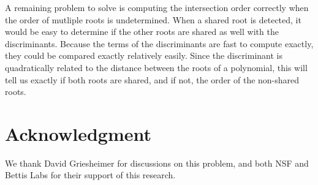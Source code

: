 \documentclass{cccg16}
\begin{document}
A remaining problem to solve is computing the intersection order
correctly when the order of mutliple roots is undetermined.  When a
shared root is detected, it would be easy to determine if the other
roots are shared as well with the discriminants.  Because the terms of
the discriminants are fast to compute exactly, they could be compared
exactly relatively easily.  Since the discriminant is quadratically
related to the distance between the roots of a polynomial, this will
tell us exactly if both roots are shared, and if not, the order of the
non-shared roots.

\section{Acknowledgment}
We thank David Griesheimer for discussions on this problem, and both
NSF and Bettis Labs for their support of this research.



\end{document}
